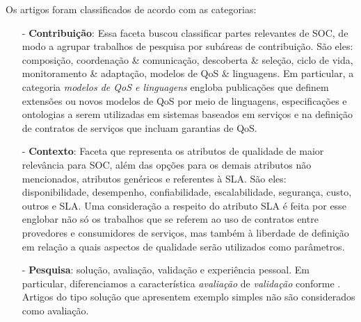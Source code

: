 Os artigos foram classificados de acordo com as categorias:
\begin{itemize}
\item[-] \textbf{Contribuição}: Essa faceta buscou classificar partes relevantes de SOC, de modo a agrupar trabalhos de pesquisa por subáreas de contribuição. São eles: composição, coordenação \& comunicação, descoberta \& seleção, ciclo de vida, monitoramento \& adaptação, modelos de QoS \& linguagens. Em particular, a categoria \emph{modelos de QoS e linguagens} engloba publicações que definem extensões ou novos modelos de QoS por meio de linguagens, especificações e ontologias a serem utilizadas em sistemas baseados em serviços e na definição de contratos de serviços que incluam garantias de QoS.
\item[-] \textbf{Contexto}: Faceta que representa os atributos de qualidade de maior relevância para SOC, além das opções para os demais atributos não mencionados, atributos genéricos e referentes à SLA. São eles: disponibilidade, desempenho, confiabilidade, escalabilidade, segurança, custo, outros e SLA. Uma consideração a respeito do atributo SLA é feita por esse englobar não só os trabalhos que se referem ao uso de contratos entre provedores e consumidores de serviços, mas também à liberdade de definição em relação a quais aspectos de qualidade serão utilizados como parâmetros.
\item[-] \textbf{Pesquisa}: solução, avaliação, validação e experiência pessoal. Em particular, diferenciamos a caracter\'{i}stica \emph{avalia\c{c}\~{a}o} de \emph{valida\c{c}\~{a}o} conforme \cite{Wieringa:10.1007/s00766-005-0021-6}. Artigos do tipo solução que apresentem exemplo simples não são considerados como avaliação.
\end{itemize}


